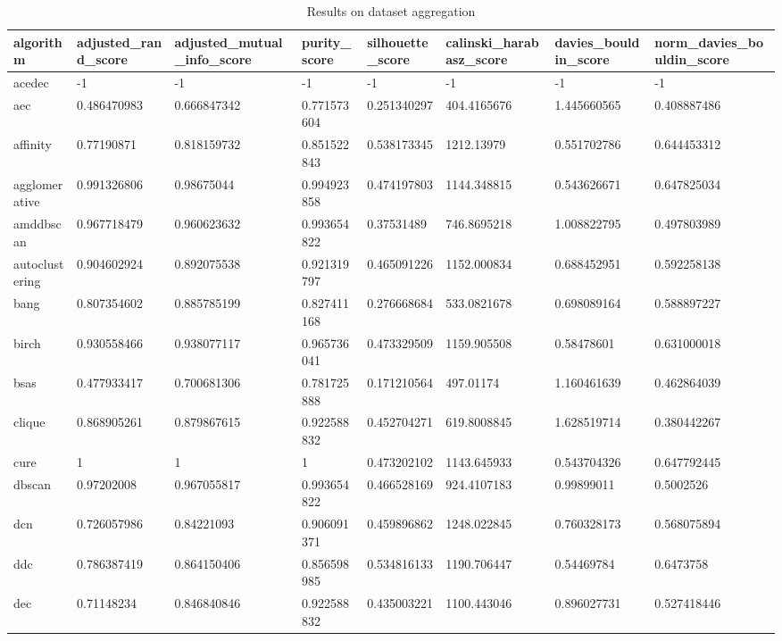 \begin{table}[H]
\centering
\caption{Results on dataset aggregation}
\label{S59_Table}
\begin{tabular}{|l|l|l|l|l|l|l|l|}
\hline
algorithm & adjusted\_rand\_score & adjusted\_mutual\_info\_score & purity\_score & silhouette\_score & calinski\_harabasz\_score & davies\_bouldin\_score & norm\_davies\_bouldin\_score \\
\hline
acedec & -1 & -1 & -1 & -1 & -1 & -1 & -1 \\
\hline
aec & 0.486470983 & 0.666847342 & 0.771573604 & 0.251340297 & 404.4165676 & 1.445660565 & 0.408887486 \\
\hline
affinity & 0.77190871 & 0.818159732 & 0.851522843 & 0.538173345 & 1212.13979 & 0.551702786 & 0.644453312 \\
\hline
agglomerative & 0.991326806 & 0.98675044 & 0.994923858 & 0.474197803 & 1144.348815 & 0.543626671 & 0.647825034 \\
\hline
amddbscan & 0.967718479 & 0.960623632 & 0.993654822 & 0.37531489 & 746.8695218 & 1.008822795 & 0.497803989 \\
\hline
autoclustering & 0.904602924 & 0.892075538 & 0.921319797 & 0.465091226 & 1152.000834 & 0.688452951 & 0.592258138 \\
\hline
bang & 0.807354602 & 0.885785199 & 0.827411168 & 0.276668684 & 533.0821678 & 0.698089164 & 0.588897227 \\
\hline
birch & 0.930558466 & 0.938077117 & 0.965736041 & 0.473329509 & 1159.905508 & 0.58478601 & 0.631000018 \\
\hline
bsas & 0.477933417 & 0.700681306 & 0.781725888 & 0.171210564 & 497.01174 & 1.160461639 & 0.462864039 \\
\hline
clique & 0.868905261 & 0.879867615 & 0.922588832 & 0.452704271 & 619.8008845 & 1.628519714 & 0.380442267 \\
\hline
cure & 1 & 1 & 1 & 0.473202102 & 1143.645933 & 0.543704326 & 0.647792445 \\
\hline
dbscan & 0.97202008 & 0.967055817 & 0.993654822 & 0.466528169 & 924.4107183 & 0.99899011 & 0.5002526 \\
\hline
dcn & 0.726057986 & 0.84221093 & 0.906091371 & 0.459896862 & 1248.022845 & 0.760328173 & 0.568075894 \\
\hline
ddc & 0.786387419 & 0.864150406 & 0.856598985 & 0.534816133 & 1190.706447 & 0.54469784 & 0.6473758 \\
\hline
dec & 0.71148234 & 0.846840846 & 0.922588832 & 0.435003221 & 1100.443046 & 0.896027731 & 0.527418446 \\

\end{tabular}
\end{table}
